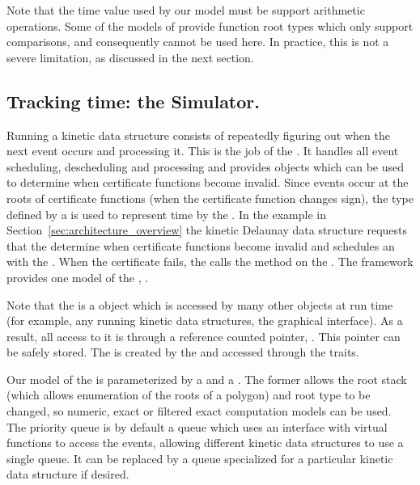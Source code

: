 Note that the time value used by our  model
must be support arithmetic operations. Some of the models of
 provide function root types which only support
comparisons, and consequently cannot be used here. In practice, this
is not a severe limitation, as discussed in the next section.

\subsection{Tracking time: the Simulator.}
\label{sec:simulator}

Running a kinetic data structure consists of repeatedly figuring out
when the next event occurs and processing it. This is the job of the
. It handles all event scheduling, descheduling and
processing and provides objects which can be used to determine when
certificate functions become invalid. Since events occur at the roots
of certificate functions (when the certificate function changes sign),
the  type defined by a  is used to
represent time by the . In the example in
Section~\ref{sec:architecture_overview} the kinetic Delaunay data
structure requests that the  determine when
 certificate functions become invalid and schedules an
 with the . When the certificate fails, the
 calls the  method on the
. The framework provides one model of the ,
.

Note that the 
is a object which is accessed by many other objects at run time (for
example, any running kinetic data structures, the graphical
interface). As a result, all access to it is through a reference
counted pointer, . This pointer can be safely stored. The
 is created by the  and accessed
through the traits.

Our model of the  is parameterized by a
 and a . The former allows the
root stack (which allows enumeration of the roots of a polygon) and
root type to be changed, so numeric, exact or filtered exact
computation models can be used. The priority queue is by default a
queue which uses an interface with virtual functions to access the
events, allowing different kinetic data structures to use a single
queue. It can be replaced by a queue specialized for a particular
kinetic data structure if desired.

